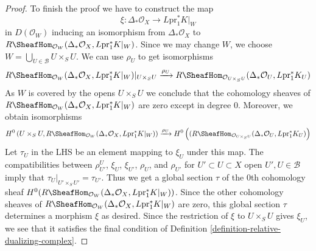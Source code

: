 \begin{proof}
\medskip\noindent
To finish the proof we have to construct the map
$$
\xi : \Delta_*\mathcal{O}_X \longrightarrow L\text{pr}_1^*K|_W
$$
in $D(\mathcal{O}_W)$ inducing an isomorphism from $\Delta_*\mathcal{O}_X$ to
$R\SheafHom_{\mathcal{O}_W}(\Delta_*\mathcal{O}_X, L\text{pr}_1^*K|_W)$.
Since we may change $W$, we choose
$W = \bigcup_{U \in \mathcal{B}} U \times_S U$.
We can use $\rho_U$ to get isomorphisms
$$
R\SheafHom_{\mathcal{O}_W}(
\Delta_*\mathcal{O}_X, L\text{pr}_1^*K|_W)|_{U \times_S U}
\xrightarrow{\rho_U}
R\SheafHom_{\mathcal{O}_{U \times_S U}}(
\Delta_*\mathcal{O}_U, L\text{pr}_1^*K_U)
$$
As $W$ is covered by the opens $U \times_S U$
we conclude that the cohomology sheaves of
$R\SheafHom_{\mathcal{O}_W}(\Delta_*\mathcal{O}_X, L\text{pr}_1^*K|_W)$
are zero except in degree $0$. Moreover, we obtain isomorphisms
$$
H^0\left(U \times_S U, R\SheafHom_{\mathcal{O}_W}(\Delta_*\mathcal{O}_X,
L\text{pr}_1^*K|_W)\right)
\xrightarrow{\rho_U}
H^0\left((R\SheafHom_{\mathcal{O}_{U \times_S U}}(
\Delta_*\mathcal{O}_U, L\text{pr}_1^*K_U)\right)
$$
Let $\tau_U$ in the LHS be an element mapping to $\xi_U$ under this map.
The compatibilities between
$\rho^U_{U'}$, $\xi_U$, $\xi_{U'}$, $\rho_U$, and $\rho_{U'}$
for $U' \subset U \subset X$ open $U', U \in \mathcal{B}$
imply that $\tau_U|_{U' \times_S U'} = \tau_{U'}$.
Thus we get a global section $\tau$ of the $0$th cohomology sheaf
$H^0(R\SheafHom_{\mathcal{O}_W}(\Delta_*\mathcal{O}_X, L\text{pr}_1^*K|_W))$.
Since the other cohomology sheaves of
$R\SheafHom_{\mathcal{O}_W}(\Delta_*\mathcal{O}_X, L\text{pr}_1^*K|_W)$
are zero, this global section $\tau$
determines a morphism $\xi$ as desired. Since the restriction
of $\xi$ to $U \times_S U$ gives $\xi_U$, we see that it
satisfies the final condition of
Definition \ref{definition-relative-dualizing-complex}.
\end{proof}